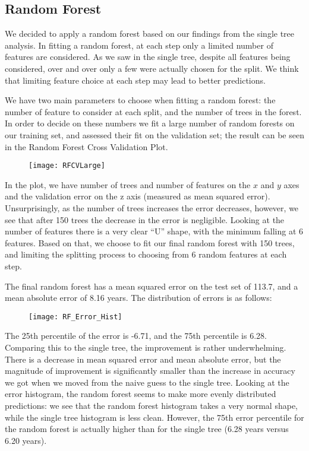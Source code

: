 \documentclass[letterpaper, 10 pt, conference]{ieeeconf}  %
\begin{document}
\subsection{Random Forest}
We decided to apply a random forest based on our findings from the single tree analysis. In fitting a random forest, at each step only a limited number of features are considered. As we saw in the single tree, despite all features being considered, over and over only a few were actually chosen for the split. We think that limiting feature choice at each step may lead to better predictions.

We have two main parameters to choose when fitting a random forest: the number of feature to consider at each split, and the number of trees in the forest. In order to decide on these numbers we fit a large number of random forests on our training set, and assessed their fit on the validation set; the result can be seen in the Random Forest Cross Validation Plot.

\begin{figure}[ht]
\label{RF CV}
\begin{center}
\texttt{[image: RFCVLarge]}
\end{center}
\end{figure}

In the plot, we have number of trees and number of features on the $x$ and $y$ axes and the validation error on the z axis (measured as mean squared error). Unsurprisingly, as the number of trees increases the error decreases, however, we see that after 150 trees the decrease in the error is negligible. Looking at the number of features there is a very clear ``U'' shape, with the minimum falling at 6 features. Based on that, we choose to fit our final random forest with 150 trees, and limiting the splitting process to choosing from 6 random features at each step. 

The final random forest has a mean squared error on the test set of 113.7, and a mean absolute error of 8.16 years. The distribution of errors is as follows:

\begin{figure}[ht]
\label{RF Error Plot}
\begin{center}
\texttt{[image: RF\_Error\_Hist]}
\end{center}
\end{figure}

The 25th percentile of the error is -6.71, and the 75th percentile is 6.28. Comparing this to the single tree, the improvement is rather underwhelming. There is a decrease in mean squared error and mean absolute error, but the magnitude of improvement is significantly smaller than the increase in accuracy we got when we moved from the naive guess to the single tree. Looking at the error histogram, the random forest seems to make more evenly distributed predictions: we see that the random forest histogram takes a very normal shape, while the single tree histogram is less clean. However, the 75th error percentile for the random forest is actually higher than for the single tree (6.28 years versus 6.20 years). 
\end{document}
